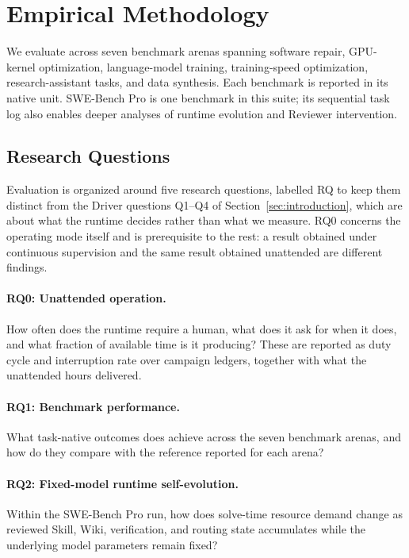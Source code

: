 \section{Empirical Methodology}
\label{sec:methodology}

We evaluate \systemname across seven benchmark arenas spanning software repair,
GPU-kernel optimization, language-model training, training-speed optimization,
research-assistant tasks, and data synthesis. Each benchmark is reported in its
native unit. SWE-Bench Pro is one benchmark in this suite; its sequential task log
also enables deeper analyses of runtime evolution and Reviewer intervention.

\subsection{Research Questions}

Evaluation is organized around five research questions, labelled RQ to keep them
distinct from the Driver questions Q1--Q4 of Section~\ref{sec:introduction}, which
are about what the runtime decides rather than what we measure. RQ0 concerns the
operating mode itself and is prerequisite to the rest: a result obtained under
continuous supervision and the same result obtained unattended are different
findings.

\paragraph{RQ0: Unattended operation.}
How often does the runtime require a human, what does it ask for when it does, and
what fraction of available time is it producing? These are reported as duty cycle and
interruption rate over campaign ledgers, together with what the unattended hours
delivered.

\paragraph{RQ1: Benchmark performance.}
What task-native outcomes does \systemname achieve across the seven benchmark
arenas, and how do they compare with the reference reported for each arena?

\paragraph{RQ2: Fixed-model runtime self-evolution.}
Within the SWE-Bench Pro run, how does solve-time resource demand change as reviewed
Skill, Wiki, verification, and routing state accumulates while the underlying model
parameters remain fixed?

